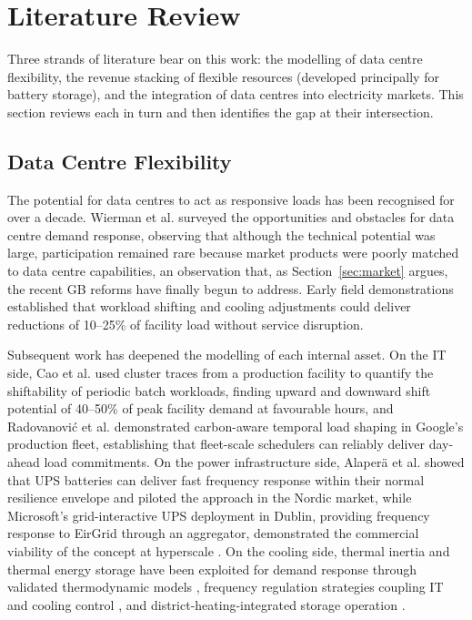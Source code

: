 \documentclass[lettersize,journal]{IEEEtran}
\begin{document}
\section{Literature Review}\label{sec:litreview}

Three strands of literature bear on this work: the modelling of data centre flexibility, the revenue stacking of flexible resources (developed principally for battery storage), and the integration of data centres into electricity markets. This section reviews each in turn and then identifies the gap at their intersection.

\subsection{Data Centre Flexibility}

The potential for data centres to act as responsive loads has been recognised for over a decade. Wierman et al. \cite{wierman2014opportunities} surveyed the opportunities and obstacles for data centre demand response, observing that although the technical potential was large, participation remained rare because market products were poorly matched to data centre capabilities, an observation that, as Section~\ref{sec:market} argues, the recent GB reforms have finally begun to address. Early field demonstrations \cite{ghatikar2012demand} established that workload shifting and cooling adjustments could deliver reductions of 10--25\% of facility load without service disruption.

Subsequent work has deepened the modelling of each internal asset. On the IT side, Cao et al. \cite{cao2022data} used cluster traces from a production facility to quantify the shiftability of periodic batch workloads, finding upward and downward shift potential of 40--50\% of peak facility demand at favourable hours, and Radovanovi{\'c} et al. \cite{radovanovic2022carbon} demonstrated carbon-aware temporal load shaping in Google's production fleet, establishing that fleet-scale schedulers can reliably deliver day-ahead load commitments. On the power infrastructure side, Alaper{\"a} et al. \cite{alapera2018data,alapera2019fast} showed that UPS batteries can deliver fast frequency response within their normal resilience envelope and piloted the approach in the Nordic market, while Microsoft's grid-interactive UPS deployment in Dublin, providing frequency response to EirGrid through an aggregator, demonstrated the commercial viability of the concept at hyperscale \cite{roach2022microsoft,dcd2022eaton,eaton2021gridinteractive}. On the cooling side, thermal inertia and thermal energy storage have been exploited for demand response through validated thermodynamic models \cite{cupelli2018data}, frequency regulation strategies coupling IT and cooling control \cite{fu2020assessments}, and district-heating-integrated storage operation \cite{du2025new}.
\end{document}
